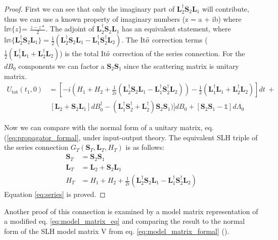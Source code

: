 \documentclass[a4paper]{article}
\theoremstyle{definition}
\begin{document}
\begin{enumerate}[label=(\roman*)]
\begin{proof}
First we can see that only the imaginary part of $\textbf{L}_2^\dagger \textbf{S}_2\textbf{L}_1$ will contribute, thus we can use a known property of imaginary numbers (z = a + ib) where $\mathbb{Im}\{z\}$= $\frac{z-z*}{2}$. The adjoint of $\textbf{L}_2^\dagger \textbf{S}_2\textbf{L}_1$ has an equivalent statement, where $\mathbb{Im}\{\textbf{L}_2^\dagger \textbf{S}_2\textbf{L}_1\} = \frac{1}{2}(\textbf{L}_2^\dagger \textbf{S}_2\textbf{L}_1 - \textbf{L}_1^\dagger \textbf{S}_2^\dagger \textbf{L}_2)$. The It$\Bar{o}$ correction terms ($\frac{1}{2}(\textbf{L}_1^\dagger \textbf{L}_1 + \textbf{L}_2^\dagger \textbf{L}_2)$) is the total It$\Bar{o}$ correction of the series connection. For the $dB_0$ components we can factor a $\textbf{S}_2\textbf{S}_1$ since the scattering matrix is unitary matrix.
\begin{align}
    U_{\text{tot}}(t_1,0) & = [-i(H_1+H_2 + \frac{1}{2i}(\textbf{L}_2^\dagger \textbf{S}_2\textbf{L}_1 - \textbf{L}_1^\dagger \textbf{S}_2^\dagger \textbf{L}_2)) - \frac{1}{2}(\textbf{L}_1^\dagger \textbf{L}_1 + \textbf{L}_2^\dagger \textbf{L}_2)] dt \ +  \nonumber \\
    & \ [\textbf{L}_2 + \textbf{S}_2\textbf{L}_1] dB_0^\dagger - (\textbf{L}_1^\dagger \textbf{S}_2^\dagger + \textbf{L}_2^\dagger) \textbf{S}_2\textbf{S}_1)] dB_0 +  [\textbf{S}_2\textbf{S}_1  - \mathbb{1} ] d\Lambda_0  \label{eq:series_total_unitary_formal}
\end{align}

Now we can compare with the normal form of a unitary matrix, eq. (\ref{eq:propagator_formal}, under input-output theory. The equivalent SLH triple of the series connection $G_T(\textbf{S}_T,\textbf{L}_T,H_T)$ is as follows: 
\begin{align*}
    \textbf{S}_T & = \textbf{S}_2\textbf{S}_1 \\
    \textbf{L}_T & = \textbf{L}_2 + \textbf{S}_2\textbf{L}_1 \\
    H_T & = H_1+H_2 + \frac{1}{2i}(\textbf{L}_2^\dagger \textbf{S}_2\textbf{L}_1 - \textbf{L}_1^\dagger \textbf{S}_2^\dagger \textbf{L}_2)
\end{align*}
Equation \ref{eq:series} is proved.

\end{proof}

Another proof of this connection is examined by a model matrix representation of a modified  eq. \ref{eq:model_matrix_eq} and comparing the result to the normal form of the SLH model matrix V  from eq. \ref{eq:model_matrix_formal} (\citealp{Gough_2008}).
\end{enumerate}
\end{document}
